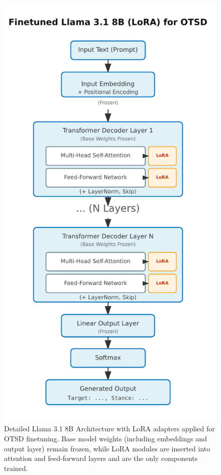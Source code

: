 \documentclass[twocolumn,11pt,letterpaper]{article}
\begin{document}
\begin{figure}[htbp]
\centering
\includegraphics[width=1\columnwidth]{figures/llama_arc.pdf}
\caption{Detailed Llama 3.1 8B Architecture with LoRA adapters applied for OTSD finetuning. Base model weights (including embeddings and output layer) remain frozen, while LoRA modules are inserted into attention and feed-forward layers and are the only components trained.}
\label{fig:llama_lora_arch}
\end{figure}
\end{document}
